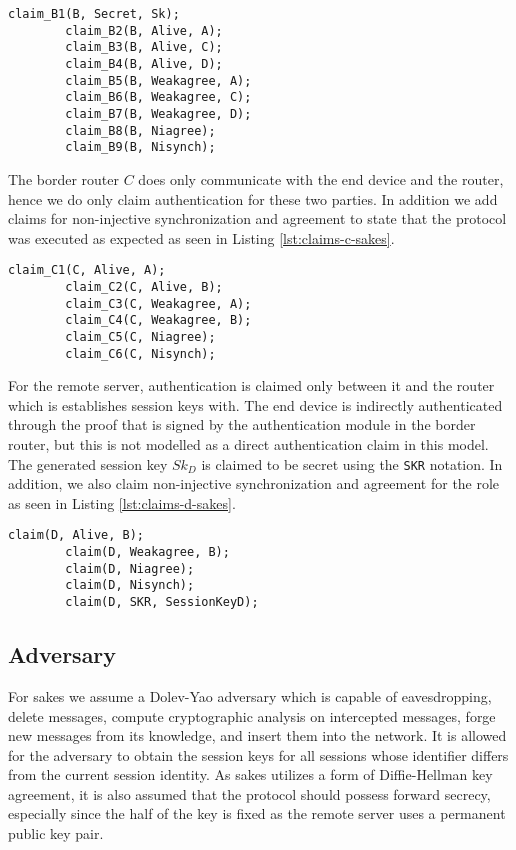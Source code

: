 \begin{lstlisting}[caption={Security claims for role B in SAKES.}, label={lst:claims-b-sakes}]
		claim_B1(B, Secret, Sk);
		claim_B2(B, Alive, A);
		claim_B3(B, Alive, C);
		claim_B4(B, Alive, D);
		claim_B5(B, Weakagree, A);
		claim_B6(B, Weakagree, C);
		claim_B7(B, Weakagree, D);
		claim_B8(B, Niagree);
		claim_B9(B, Nisynch);
\end{lstlisting}

The border router $C$ does only communicate with the end device and the router, hence we do only claim authentication for these two parties. In addition we add claims for non-injective synchronization and agreement to state that the protocol was executed as expected as seen in Listing \ref{lst:claims-c-sakes}. 

\begin{lstlisting}[caption={Security claims for role C in SAKES.}, label={lst:claims-c-sakes}]
		claim_C1(C, Alive, A);
		claim_C2(C, Alive, B);
		claim_C3(C, Weakagree, A);
		claim_C4(C, Weakagree, B);
		claim_C5(C, Niagree);
		claim_C6(C, Nisynch);
\end{lstlisting}

For the remote server, authentication is claimed only between it and the router which is establishes session keys with. The end device is indirectly authenticated through the proof that is signed by the authentication module in the border router, but this is not modelled as a direct authentication claim in this model. The generated session key $Sk_D$ is claimed to be secret using the \texttt{SKR} notation. In addition, we also claim non-injective synchronization and agreement for the role as seen in Listing \ref{lst:claims-d-sakes}.


\begin{lstlisting}[caption={Security claims for role D in SAKES.}, label={lst:claims-d-sakes}]
		claim(D, Alive, B);
		claim(D, Weakagree, B);
		claim(D, Niagree);
		claim(D, Nisynch);
		claim(D, SKR, SessionKeyD);
\end{lstlisting}

\subsection{Adversary}

For \gls{sakes} we assume a Dolev-Yao adversary which is capable of eavesdropping, delete messages, compute cryptographic analysis on intercepted messages, forge new messages from its knowledge, and insert them into the network. It is allowed for the adversary to obtain the session keys for all sessions whose identifier differs from the current session identity. As \gls{sakes} utilizes a form of Diffie-Hellman key agreement, it is also assumed that the protocol should possess forward secrecy, especially since the half of the key is fixed as the remote server uses a permanent public key pair.


